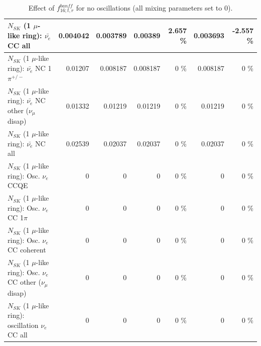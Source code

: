 \begin{table}
\begin{tabular}{| l | r | r | r  r | r  r |}
                            $N_{SK}$ (1 $\mu$-like ring): $\bar{\nu_{e}}$ CC all &        0.004042 &        0.003789 &         0.00389 &    2.657 \%  &        0.003693 &   -2.557 \%  \\ 
\hline
                     $N_{SK}$ (1 $\mu$-like ring): $\bar{\nu_e}$ NC 1$\pi^{+/-}$ &         0.01207 &        0.008187 &        0.008187 &        0 \%  &        0.008187 &        0 \%  \\ 
          $N_{SK}$ (1 $\mu$-like ring): $\bar{\nu_e}$ NC other ($\nu_\mu$ disap) &         0.01332 &         0.01219 &         0.01219 &        0 \%  &         0.01219 &        0 \%  \\ 
                            $N_{SK}$ (1 $\mu$-like ring): $\bar{\nu_{e}}$ NC all &         0.02539 &         0.02037 &         0.02037 &        0 \%  &         0.02037 &        0 \%  \\ 
\hline
\hline
\hline
                                 $N_{SK}$ (1 $\mu$-like ring): Osc. $\nu_e$ CCQE &               0 &               0 &               0 &        0 \%  &               0 &        0 \%  \\ 
                            $N_{SK}$ (1 $\mu$-like ring): Osc. $\nu_e$ CC 1$\pi$ &               0 &               0 &               0 &        0 \%  &               0 &        0 \%  \\ 
                          $N_{SK}$ (1 $\mu$-like ring): Osc. $\nu_e$ CC coherent &               0 &               0 &               0 &        0 \%  &               0 &        0 \%  \\ 
           $N_{SK}$ (1 $\mu$-like ring): Osc. $\nu_e$ CC other ($\nu_\mu$ disap) &               0 &               0 &               0 &        0 \%  &               0 &        0 \%  \\ 
                        $N_{SK}$ (1 $\mu$-like ring): oscillation $\nu_e$ CC all &               0 &               0 &               0 &        0 \%  &               0 &        0 \%  \\ 
\hline
\hline
\end{tabular}
\caption{ Effect of $f_{16; t, r}^{banff}$ for no oscillations (all mixing parameters set to 0). }
\label{tab:num_banff_maqe_1RmuT_3f_osc_t13:0}
\end{table}
\clearpage
